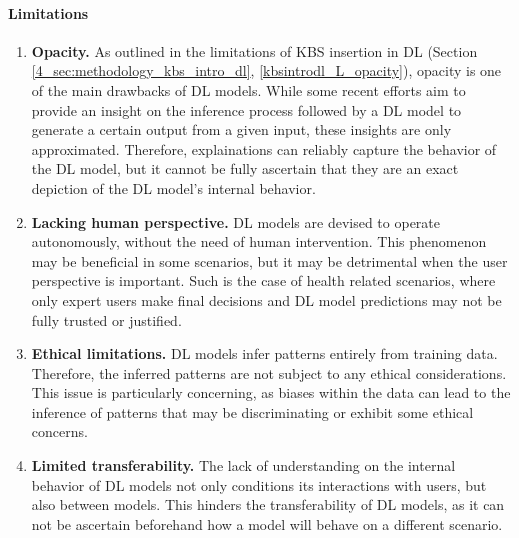 \paragraph{Limitations}
\begin{enumerate} [start=1,label={\bfseries L\arabic*.}]
    \item \textbf{Opacity.} \label{kbsextradl_L_opacity} As outlined in the limitations of KBS insertion in DL (Section \ref{4_sec:methodology_kbs_intro_dl}, \ref{kbsintrodl_L_opacity}), opacity is one of the main drawbacks of DL models. While some recent efforts aim to provide an insight on the inference process followed by a DL model to generate a certain output from a given input, these insights are only approximated. Therefore, explainations can reliably capture the behavior of the DL model, but it cannot be fully ascertain that they are an exact depiction of the DL model's internal behavior.

    \item \textbf{Lacking human perspective.} \label{kbsextradl_L_human} DL models are devised to operate autonomously, without the need of human intervention. This phenomenon may be beneficial in some scenarios, but it may be detrimental when the user perspective is important. Such is the case of health related scenarios, where only expert users make final decisions and DL model predictions may not be fully trusted or justified. 
    
    \item \textbf{Ethical limitations.} \label{kbsextradl_L_ethical} DL models infer patterns entirely from training data. Therefore, the inferred patterns are not subject to any ethical considerations. This issue is particularly concerning, as biases within the data can lead to the inference of patterns that may be discriminating or exhibit some ethical concerns.
    
    \item \textbf{Limited transferability.}\label{kbsextradl_L_transferability} The lack of understanding on the internal behavior of DL models not only conditions its interactions with users, but also between models. This hinders the transferability of DL models, as it can not be ascertain beforehand how a model will behave on a different scenario.
\end{enumerate}

